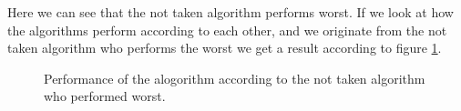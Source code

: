 \documentclass[titlepage, a4paper]{article}
\begin{document}
Here we can see that the not taken algorithm performs worst. If we look at how the algorithms perform according to each other, and we originate from the not taken algorithm who performs the worst we get a result according to figure \ref{fig:comparative-evaluation}.


\begin{figure}[H]
	\centering
	\caption{Performance of the alogorithm according to the not taken algorithm who performed worst.}
	\label{fig:comparative-evaluation}
\end{figure}
\end{document}
